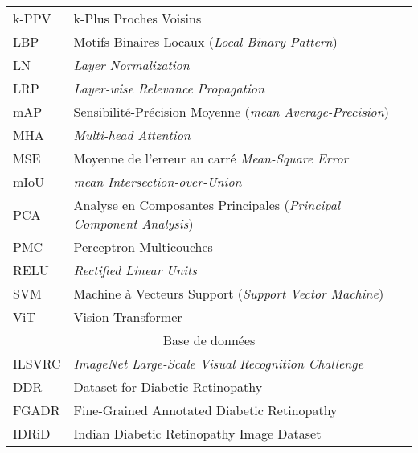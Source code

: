 \begin{longtable}{lp{5in}}
k-PPV & k-Plus Proches Voisins \\
LBP & Motifs Binaires Locaux (\textit{Local Binary Pattern}) \\
LN & \textit{Layer Normalization} \\
LRP & \textit{Layer-wise Relevance Propagation} \\
mAP & Sensibilité-Précision Moyenne (\textit{mean Average-Precision})\\
MHA & \textit{Multi-head Attention} \\
MSE & Moyenne de l'erreur au carré \textit{Mean-Square Error} \\
mIoU & \textit{mean Intersection-over-Union}\\
PCA & Analyse en Composantes Principales (\textit{Principal Component Analysis}) \\
PMC & Perceptron Multicouches \\
RELU & \textit{Rectified Linear Units} \\
SVM & Machine à Vecteurs Support (\textit{Support Vector Machine}) \\
ViT & Vision Transformer \\
\hline
\multicolumn{2}{c}{Base de données} \\
\hline
ILSVRC & \textit{ImageNet Large-Scale Visual Recognition Challenge}\\
DDR & Dataset for Diabetic Retinopathy \\
FGADR & Fine-Grained Annotated Diabetic Retinopathy \\
IDRiD & Indian Diabetic Retinopathy Image Dataset \\

\end{longtable}

